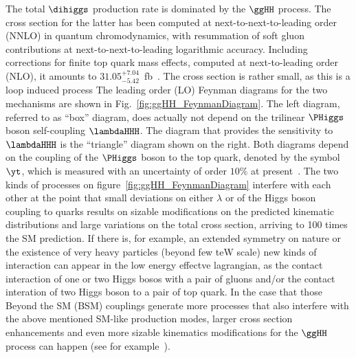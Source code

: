 The total $\dihiggs$ production rate is dominated by the $\ggHH$ process.
The cross section for the latter has been computed at next-to-next-to-leading order (NNLO) in quantum chromodynamics,
with resummation of soft gluon contributions at next-to-next-to-leading logarithmic accuracy.
Including corrections for finite top quark mass effects, computed at next-to-leading order (NLO),
it amounts to $31.05^{+7.04}_{-5.42}$~fb~\cite{Grazzini:2018bsd}.
The cross section is rather small, as this is a loop induced process
The leading order (LO) Feynman diagrams for the two mechanisms are shown in Fig.~\ref{fig:ggHH_FeynmanDiagram}.
The left diagram, referred to as ``box'' diagram, does actually not depend on the trilinear $\PHiggs$ boson self-coupling $\lambdaHHH$.
The diagram that provides the sensitivity to $\lambdaHHH$ is the ``triangle'' diagram shown on the right.
Both diagrams depend on the coupling of the $\PHiggs$ boson to the top quark, denoted by the symbol $\yt$,
which is measured with an uncertainty of order $10\%$ at present~\cite{Aaboud:2018urx,HIG-17-035}. The two kinds of processes on figure~\ref{fig:ggHH_FeynmanDiagram} interfere with each other at the point that small deviations on either $\lambda$ or of the Higgs boson coupling to quarks results on sizable modifications on the predicted kinematic distributions and large variations on the total cross section, arriving to 100 times the SM prediction. If there is, for example, an extended symmetry on nature or the existence of very heavy particles (beyond few teW scale) new kinds of interaction can appear in the low energy effectve lagrangian, as the contact interaction of one or two Higgs bosos with a pair of gluons and/or the contact interation of two Higgs boson to a pair of top quark. In the case that those Beyond the SM (BSM) couplings generate more processes that also interfere with the above mentioned SM-like production modes, larger cross section enhancements and even more sizable kinematics modifications for the $\ggHH$ process can happen (see for example~\cite{Carvalho:2015ttv}).


